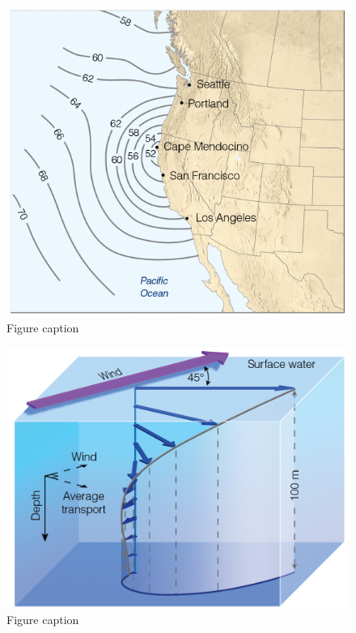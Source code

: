 \documentclass[12pt,oneside]{book}
\begin{document}
\begin{figure}

{\centering \includegraphics[width=0.8\linewidth]{figures/Figure532a} 

}

\caption{Figure caption}\label{fig:Fig532a}
\end{figure}\begin{figure}

{\centering \includegraphics[width=0.8\linewidth]{figures/Figure532b} 

}

\caption{Figure caption}\label{fig:Fig532b}
\end{figure}
\end{document}
